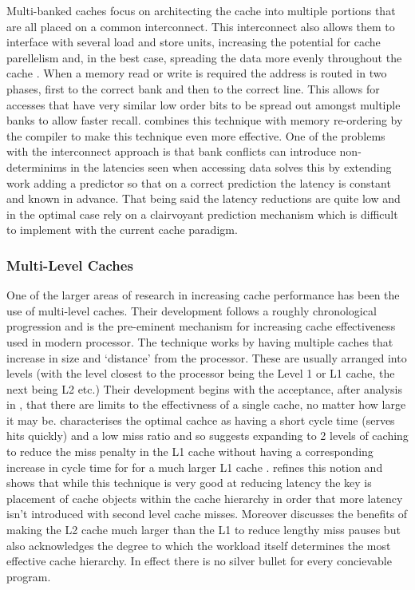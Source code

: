 Multi-banked caches focus on architecting the cache into multiple portions that are all placed on a common interconnect. This interconnect also allows them to interface with several load and store units, increasing the potential for cache parellelism and, in the best case, spreading the data more evenly throughout the cache \cite{riversHighbandwidthDataCache1997}. When a memory read or write is required the address is routed in two phases, first to the correct bank and then to the correct line. This allows for accesses that have very similar low order bits to be spread out amongst multiple banks to allow faster recall. \citet{riversHighbandwidthDataCache1997} combines this technique with memory re-ordering by the compiler to make this technique even more effective. One of the problems with the interconnect approach is that bank conflicts can introduce non-determinims in the latencies seen when accessing data \citet{neefsTechniqueHighBandwidth2000} solves this by extending \citeauthor{riversHighbandwidthDataCache1997} work adding a predictor so that on a correct prediction the latency is constant and known in advance. That being said the latency reductions are quite low and in the optimal case rely on a clairvoyant prediction mechanism which is difficult to implement with the current cache paradigm.

\subsubsection{Multi-Level Caches}
\label{sec:multi-level}
One of the larger areas of research in increasing cache performance has been the use of multi-level caches. Their development follows a roughly chronological progression and is the pre-eminent mechanism for increasing cache effectiveness used in modern processor. The technique works by having multiple caches that increase in size and `distance' from the processor. These are usually arranged into levels (with the level closest to the processor being the Level 1 or L1 cache, the next being L2 etc.) Their development begins with the acceptance, after analysis in \citet{przybylskiPerformanceTradeoffsCache1988}, that there are limits to the effectivness of a single cache, no matter how large it may be. \citet{przybylskiCharacteristicsPerformanceOptimalMultilevel1989} characterises the optimal cachce as having a short cycle time (serves hits quickly) and a low miss ratio and so suggests expanding to 2 levels of caching to reduce the miss penalty in the L1 cache without having a corresponding increase in cycle time for for a much larger L1 cache \cite{jouppiTradeoffsTwolevelOnchip1994}. \citet{azimiTwoLevelCache1992} refines this notion and shows that while this technique is very good at reducing latency the key is placement of cache objects within the cache hierarchy in order that more latency isn't introduced with second level cache misses. Moreover \citet{ju-hotangPerformanceDesignChoices1994} discusses the benefits of making the L2 cache much larger than the L1 to reduce lengthy miss pauses but also acknowledges the degree to which the workload itself determines the most effective cache hierarchy. In effect there is no silver bullet for every concievable program. 

